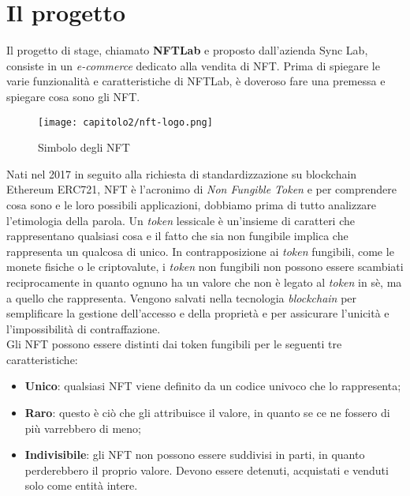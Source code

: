 
\section{Il progetto}
Il progetto di stage, chiamato \textbf{NFTLab} e proposto dall'azienda Sync Lab, consiste in un \textit{e-commerce} dedicato alla vendita di NFT. Prima di spiegare le varie funzionalità e caratteristiche di NFTLab, è doveroso fare una premessa e spiegare cosa sono gli NFT. \\

\begin{figure}[!h]
  \centering
  \texttt{[image: capitolo2/nft-logo.png]}
  \caption{Simbolo degli NFT}
\end{figure}

Nati nel 2017 in seguito alla richiesta di standardizzazione su blockchain Ethereum ERC721, NFT è l'acronimo di \textit{Non Fungible Token} e per comprendere cosa sono e le loro possibili applicazioni, dobbiamo prima di tutto analizzare l'etimologia della parola.
Un \textit{token} lessicale è un'insieme di caratteri che rappresentano qualsiasi cosa e il fatto che sia non fungibile implica che rappresenta un qualcosa di unico.
In contrapposizione ai \textit{token} fungibili, come le monete fisiche o le \gls{criptovalute}, i \textit{token} non fungibili non possono essere scambiati reciprocamente in quanto ognuno ha un valore che non è legato al \textit{token} in sè, ma a quello che rappresenta.
Vengono salvati nella tecnologia \textit{blockchain} per semplificare la gestione dell'accesso e della proprietà e per assicurare l'unicità e l'impossibilità di contraffazione. \\

\noindent Gli NFT possono essere distinti dai token fungibili per le seguenti tre caratteristiche:
\begin{itemize}
  \item \textbf{Unico}: qualsiasi NFT viene definito da un codice univoco che lo rappresenta;
  \item \textbf{Raro}: questo è ciò che gli attribuisce il valore, in quanto se ce ne fossero di più varrebbero di meno;
  \item \textbf{Indivisibile}: gli NFT non possono essere suddivisi in parti, in quanto perderebbero il proprio valore. Devono essere detenuti, acquistati e venduti solo come entità intere.
\end{itemize}

